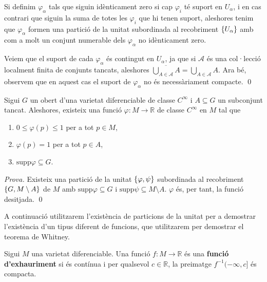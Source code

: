 {    Si definim $\varphi_\alpha$ tals que siguin idènticament zero si cap $\varphi_i$ té suport en $U_\alpha$, i en cas contrari que siguin la suma de totes les $\varphi_i$ que hi tenen suport, aleshores tenim que $\varphi_\alpha$ formen una partició de la unitat subordinada al recobriment $\{U_\alpha\}$ amb com a molt un conjunt numerable dels $\varphi_\alpha$ no idènticament zero.

    Veiem que el suport de cada $\varphi_\alpha$ és contingut en $U_\alpha$, ja que si $\mathcal A$ és una col·lecció localment finita de conjunts tancats, aleshores $\overline{\bigcup_{A\in \mathcal A} A} = \bigcup_{A\in \mathcal A} A$. Ara bé, observem que en aquest cas el suport de $\varphi_\alpha$ no és necessàriament compacte.
    \qed
}
\begin{corol}
    Sigui $G$ un obert d'una varietat diferenciable de classe $C^\infty$ i $A\subseteq G$ un subconjunt tancat. Aleshores, existeix una funció $\varphi:M\to\mathbb R$ de classe $C^\infty$ en $M$ tal que
    \begin{enumerate}
        \item $0\leq\varphi(p)\leq 1$ per a tot $p\in M$,
        \item $\varphi(p) = 1$ per a tot $p\in A$,
        \item $\text{supp}\varphi\subseteq G$.
    \end{enumerate}
\end{corol}
{
\color{black} \textit{Prova.} 
Existeix una partició de la unitat $\{\varphi, \psi\}$ subordinada al recobriment $\{G, M\setminus A\}$ de $M$ amb $\text{supp}\varphi\subseteq G$ i $\text{supp}\psi\subseteq M\setminus A$. $\varphi$ és, per tant, la funció desitjada. \qed
}

A continuació utilitzarem l'existència de particions de la unitat per a demostrar l'existència d'un tipus diferent de funcions, que utilitzarem per demostrar el teorema de Whitney.

\begin{defi}\label{def:funció_exhauriment}
    Sigui $M$ una varietat diferenciable. Una funció $f:M\to\mathbb R$ és una \textbf{funció d'exhauriment} si és contínua i per qualsevol $c\in\mathbb R$, la preimatge $f^{-1}(-\infty,c]$ és compacta.
\end{defi}

